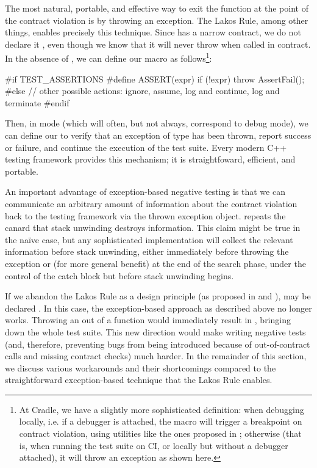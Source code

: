 The most natural, portable, and effective way to exit the function at the point of the contract violation is by throwing an exception. The Lakos Rule, among other things, enables precisely this technique. Since  has a narrow contract, we do not declare it , even though we know that it will never throw when called in contract. In the absence of , we can define our  macro as follows\footnote{At Cradle, we have a slightly more sophisticated definition: when debugging locally, i.e. if a debugger is attached, the  macro will trigger a breakpoint on contract violation, using utilities like the ones proposed in \cite{P2514R0}; otherwise (that is, when running the test suite on CI, or locally but without a debugger attached), it will throw an  exception as shown here.}:
\begin{codeblock}
#if TEST_ASSERTIONS
  #define ASSERT(expr) if (!expr) throw AssertFail();
#else
  // other possible actions: ignore, assume, log and continue, log and terminate
#endif
\end{codeblock}
Then, in  mode (which will often, but not always, correspond to debug mode), we can define our  to verify that an exception of type  has been thrown, report success or failure, and continue the execution of the test suite. Every modern C++ testing framework provides this mechanism; it is straightfoward, efficient, and portable.

An important advantage of exception-based negative testing is that we can communicate an arbitrary amount of information about the contract violation back to the testing framework via the thrown exception object. \cite{P1656R2} repeats the canard that stack unwinding destroys information. This claim might be true in the na\" ive case, but any sophisticated implementation will collect the relevant information before stack unwinding, either immediately before throwing the exception or (for more general benefit) at the end of the search phase, under the control of the catch block but before stack unwinding begins.

If we abandon the Lakos Rule as a design principle (as proposed in \cite{P1656R2} and \cite{P2148R0}),  may be declared . In this case, the exception-based approach as described above no longer works. Throwing an  out of a  function would immediately result in , bringing down the whole test suite. This new direction would make writing negative tests (and, therefore, preventing bugs from being introduced because of out-of-contract calls and missing contract checks) much harder. In the remainder of this section, we discuss various workarounds and their shortcomings compared to the straightforward exception-based technique that the Lakos Rule enables.

